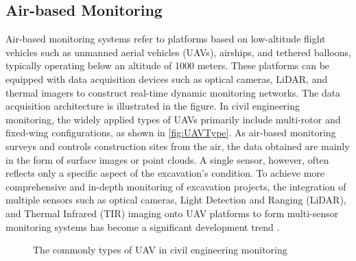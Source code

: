 \documentclass[preprint,11pt,authoryear,3p]{elsarticle}
\begin{document}
\subsection{Air-based Monitoring}

Air-based monitoring systems refer to platforms based on low-altitude flight vehicles such as unmanned aerial vehicles (UAVs), airships, and tethered balloons, typically operating below an altitude of 1000 meters. These platforms can be equipped with data acquisition devices such as optical cameras, LiDAR, and thermal imagers to construct real-time dynamic monitoring networks\citep{ren2019review,yang2022uav}. The data acquisition architecture is illustrated in the figure.
In civil engineering monitoring, the widely applied types of UAVs primarily include multi-rotor and fixed-wing configurations, as shown in \autoref{fig:UAVType}. As air-based monitoring surveys and controls construction sites from the air, the data obtained are mainly in the form of surface images or point clouds. A single sensor, however, often reflects only a specific aspect of the excavation's condition. To achieve more comprehensive and in-depth monitoring of excavation projects, the integration of multiple sensors such as optical cameras, Light Detection and Ranging (LiDAR), and Thermal Infrared (TIR) imaging onto UAV platforms to form multi-sensor monitoring systems has become a significant development trend \citep{nwaogu2023application}.

\begin{figure}
    \centering
    \hfill
    \caption{The commonly types of UAV in civil engineering monitoring}
    \label{fig:UAVType}
\end{figure}
\end{document}
